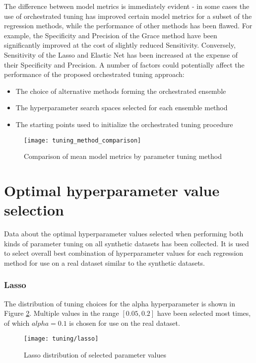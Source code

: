

The difference between model metrics is immediately evident - in some cases the use of orchestrated tuning has improved certain model metrics for a subset of the regression methods, while the performance of other methods has been flawed. For example, the Specificity and Precision of the Grace method have been significantly improved at the cost of slightly reduced Sensitivity. Conversely, Sensitivity of the Lasso and Elastic Net has been increased at the expense of their Specificity and Precision. A number of factors could potentially affect the performance of the proposed orchestrated tuning approach:
\begin{itemize}
	\item The choice of alternative methods forming the orchestrated ensemble
	\item The hyperparameter search spaces selected for each ensemble method
	\item The starting points used to initialize the orchestrated tuning procedure
\end{itemize}

\begin{figure}[H]
	\centering
	\texttt{[image: tuning\_method\_comparison]}
	\caption{Comparison of mean model metrics by parameter tuning method}
	\label{fig:met_comp}
\end{figure}

\section{Optimal hyperparameter value selection} \label{sec:opt_param_val}
Data about the optimal hyperparameter values selected when performing both kinds of parameter tuning on all synthetic datasets has been collected. It is used to select overall best combination of hyperparameter values for each regression method for use on a real dataset similar to the synthetic datasets.

\subsubsection{Lasso}
The distribution of tuning choices for the alpha hyperparameter is shown in Figure \ref{fig:tun_lasso}. Multiple values in the range $[0.05, 0.2]$ have been selected most times, of which $alpha = 0.1$ is chosen for use on the real dataset.
\begin{figure}[H]
	\centering
	\texttt{[image: tuning/lasso]}
	\caption{Lasso distribution of selected parameter values}
	\label{fig:tun_lasso}
\end{figure}


